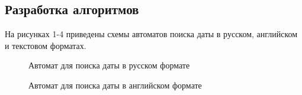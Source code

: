 \documentclass[a4paper, 14pt]{article}
\begin{document}
        \subsection{Разработка алгоритмов}
        На рисунках 1-4 приведены схемы автоматов поиска даты в русском, английском и текстовом форматах.\\
    	\begin{figure}[h]
        	\caption{Автомат для поиска даты в русском формате}
        	\label{fig:schema_standart}
        \end{figure}
    	\begin{figure}[h]
        	\caption{Автомат для поиска даты в английском формате}
        	\label{fig:schema_vinograd}
        \end{figure}
        \newpage    
\end{document}
